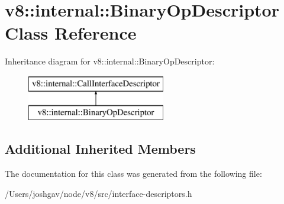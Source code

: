 \hypertarget{classv8_1_1internal_1_1_binary_op_descriptor}{}\section{v8\+:\+:internal\+:\+:Binary\+Op\+Descriptor Class Reference}
\label{classv8_1_1internal_1_1_binary_op_descriptor}
Inheritance diagram for v8\+:\+:internal\+:\+:Binary\+Op\+Descriptor\+:\begin{figure}[H]
\begin{center}
\leavevmode
\includegraphics[height=2.000000cm]{classv8_1_1internal_1_1_binary_op_descriptor}
\end{center}
\end{figure}
\subsection*{Additional Inherited Members}


The documentation for this class was generated from the following file\+:\begin{DoxyCompactItemize}
\item 
/\+Users/joshgav/node/v8/src/interface-\/descriptors.\+h\end{DoxyCompactItemize}

